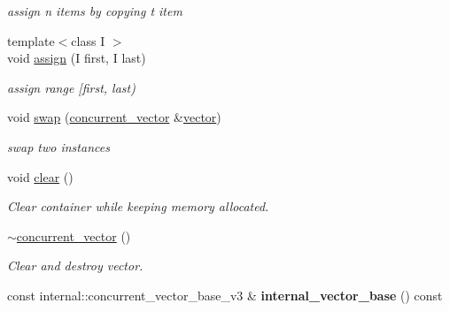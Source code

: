 \begin{DoxyCompactItemize}
\begin{DoxyCompactList}\small\item\em assign n items by copying t item \end{DoxyCompactList}\item 
\hypertarget{classtbb_1_1concurrent__vector_adf58471bc5f57b801d887e34ddf72033}{}{\footnotesize template$<$class I $>$ }\\void \hyperlink{classtbb_1_1concurrent__vector_adf58471bc5f57b801d887e34ddf72033}{assign} (I first, I last)\label{classtbb_1_1concurrent__vector_adf58471bc5f57b801d887e34ddf72033}

\begin{DoxyCompactList}\small\item\em assign range \mbox{[}first, last) \end{DoxyCompactList}\item 
\hypertarget{classtbb_1_1concurrent__vector_ad2d9ddd0aae0dde02ce80fb66a8496f9}{}void \hyperlink{classtbb_1_1concurrent__vector_ad2d9ddd0aae0dde02ce80fb66a8496f9}{swap} (\hyperlink{classtbb_1_1concurrent__vector}{concurrent\+\_\+vector} \&\hyperlink{structvector}{vector})\label{classtbb_1_1concurrent__vector_ad2d9ddd0aae0dde02ce80fb66a8496f9}

\begin{DoxyCompactList}\small\item\em swap two instances \end{DoxyCompactList}\item 
void \hyperlink{classtbb_1_1concurrent__vector_a1f3916a3e461f24710bb87ce40debf1c}{clear} ()
\begin{DoxyCompactList}\small\item\em Clear container while keeping memory allocated. \end{DoxyCompactList}\item 
\hypertarget{classtbb_1_1concurrent__vector_ac2290bb646044670b1808418210ddcf8}{}\hyperlink{classtbb_1_1concurrent__vector_ac2290bb646044670b1808418210ddcf8}{$\sim$concurrent\+\_\+vector} ()\label{classtbb_1_1concurrent__vector_ac2290bb646044670b1808418210ddcf8}

\begin{DoxyCompactList}\small\item\em Clear and destroy vector. \end{DoxyCompactList}\item 
\hypertarget{classtbb_1_1concurrent__vector_ae0382aeff4cb962f93d67e25cca13c92}{}const internal\+::concurrent\+\_\+vector\+\_\+base\+\_\+v3 \& {\bfseries internal\+\_\+vector\+\_\+base} () const \label{classtbb_1_1concurrent__vector_ae0382aeff4cb962f93d67e25cca13c92}


\end{DoxyCompactItemize}
